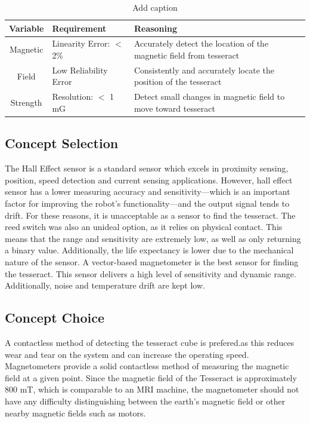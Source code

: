 \documentclass[12pt]{article}
\begin{document}
\begin{table}[htbp]
  \centering
  \caption{Add caption}
    \begin{tabular}{c|p{11.5em}|p{29.89em}}
    \multicolumn{1}{p{5.5em}|}{\textbf{Variable}} & \textbf{Requirement} & \textbf{Reasoning} \bigstrut[b]\\
    \hline
    Magnetic & Linearity Error: $<$ 2\% & Accurately detect the location of the magnetic field from tesseract \bigstrut[t]\\
    Field  & Low Reliability Error & Consistently and accurately locate the position of the tesseract \\
    Strength & Resolution: $<$ 1 mG & Detect small changes in magnetic field to move toward tesseract \\
    \end{tabular}%
  \label{tab:addlabel}%
\end{table}%





\subsection{Concept Selection}
The Hall Effect sensor is a standard sensor which excels in proximity sensing, position, speed detection and current sensing applications. However, hall effect sensor has a lower measuring accuracy and sensitivity—which is an important factor for improving the robot’s functionality—and the output signal tends to drift. For these reasons, it is unacceptable as a sensor to find the tesseract.
The reed switch was also an unideal option, as it relies on physical contact. This means that the range and sensitivity are extremely low, as well as only returning a binary value. Additionally, the life expectancy is lower due to the mechanical nature of the sensor.
A vector-based magnetometer is the best sensor for finding the tesseract. This sensor delivers a high level of sensitivity and dynamic range. Additionally, noise and temperature drift are kept low. 

\subsection{Concept Choice}
A contactless method of detecting the tesseract cube is prefered.as this reduces wear and tear on the system and can increase the operating speed. Magnetometers provide a solid contactless method of measuring the magnetic field at a given point. Since the magnetic field of the Tesseract is approximately 800 mT, which is comparable to an MRI machine, the magnetometer should not have any difficulty distinguishing between the earth’s magnetic field or other nearby magnetic fields such as motors.
\end{document}
